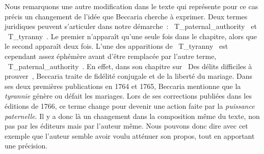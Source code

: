 Nous remarquons une autre modification dans le texte qui représente pour ce cas précis un changement de l’idée que Beccaria cherche à exprimer. Deux termes juridiques peuvent s’articuler dans notre démarche~: \og~T\_paternal\_authority~\fg{} et \og~T\_tyranny~\fg{}. Le premier n’apparaît qu’une seule fois dans le chapitre, alors que le second apparaît deux fois. L’une des apparitions de \og~T\_tyranny~\fg{} est cependant assez éphémère avant d’être remplacée par l’autre terme, \og~T\_paternal\_authority~\fg{}. En effet, dans son chapitre sur \og~Des délits difficiles à prouver~\fg{}, Beccaria traite de fidélité conjugale et de la liberté du mariage. Dans ses deux premières publications en 1764 et 1765, Beccaria mentionne que la \textit{tyrannie} génère ou défait les mariages. Lors de ses corrections publiées dans les éditions de 1766, ce terme change pour devenir une action faite par la \textit{puissance paternelle}. Il y a donc là un changement dans la composition même du texte, non pas par les éditeurs mais par l’auteur même. Nous pouvons donc dire avec cet exemple que l’auteur semble avoir voulu atténuer son propos, tout en apportant une précision.

